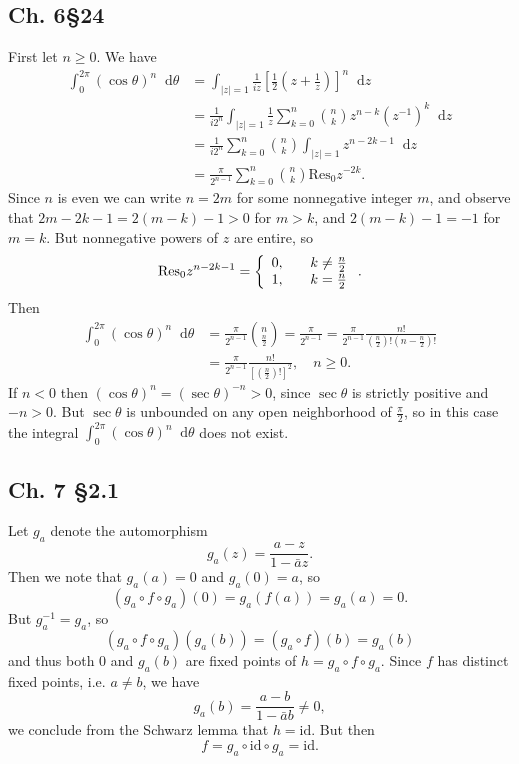 \documentclass{article}
\newcommand\id{\mathrm{id}}
\newcommand\Res{\mathrm{Res}}
\newcommand\dif{\mathop{}\!\mathrm{d}}
\begin{document}
\subsection{Ch. 6\S 24}
First let $n \geq 0$. We have
\begin{align*}
   \int_0^{2\pi}
     (\cos \theta)^n
     \dif \theta
&= \int_{|z| = 1}
     \frac{1}{iz}
     \left[
       \frac{1}{2}
       \left(
         z + \frac{1}{z}
       \right)
     \right]^n
     \dif z \\
&= \frac{1}{i 2^n}
   \int_{|z| = 1}
     \frac{1}{z}
     \sum_{k = 0}^{n}
       {n \choose k}
       z^{n - k}
       (z^{-1})^k
     \dif z \\
&= \frac{1}{i 2^n}
   \sum_{k = 0}^n
     {n \choose k}
     \int_{|z| = 1}
       z^{n - 2k - 1}
       \dif z \\
&= \frac{\pi}{2^{n-1}}
   \sum_{k = 0}^n
     {n \choose k}
     \Res_0 z^{-2k}.
\end{align*}
Since $n$ is even we can write $n = 2m$ for some nonnegative
integer $m$, and observe that
$2m - 2k - 1 = 2(m - k) - 1 > 0$ for $m > k$, and
$2(m - k) - 1 = -1$ for $m = k$. But nonnegative powers of
$z$ are entire, so
$$
  \Res_0 z^{n - 2k - 1}
= \left\{
    \begin{array}{c c}
      0, & \quad k \neq \frac{n}{2} \\
      1, & \quad k = \frac{n}{2}
    \end{array}
  \right..
$$
Then
\begin{align*}
   \int_0^{2\pi}
     (\cos \theta)^n
     \dif \theta
&= \frac{\pi}{2^{n-1}}
     {n \choose \frac{n}{2}}
 = \frac{\pi}{2^{n-1}}
 = \frac{\pi}{2^{n-1}}
     \frac{n!}
          {\left(\frac{n}{2}\right)!
           \left(n - \frac{n}{2}\right)!} \\
&= \frac{\pi}{2^{n-1}}
     \frac{n!}
          {\left[
             \left(\frac{n}{2}\right)!
           \right]^2}
, \quad n \geq 0.
\end{align*}
If $n < 0$ then $(\cos \theta)^n = (\sec \theta)^{-n} > 0$, since
$\sec \theta$ is strictly positive and $-n > 0$. But $\sec \theta$
is unbounded on any open neighborhood of $\frac{\pi}{2}$, so in this
case the integral $\int_0^{2\pi} (\cos \theta)^n \dif \theta$ does not
exist.

\subsection{Ch. 7 \S 2.1}
Let $g_a$ denote the automorphism
$$
g_a(z) = \frac{a - z}{1 - \bar{a} z}.
$$
Then we note that $g_a(a) = 0$ and $g_a(0) = a$, so
$$
  (g_a \circ f \circ g_a)(0)
= g_a(f(a))
= g_a(a)
= 0.
$$
But $g_a^{-1} = g_a$, so
$$
  (g_a \circ f \circ g_a)(g_a(b))
= (g_a \circ f)(b)
= g_a(b)
$$
and thus both 0 and $g_a(b)$ are fixed points of
$h = g_a \circ f \circ g_a$. Since $f$ has distinct
fixed points, i.e. $a \neq b$, we
have
$$
g_a(b) = \frac{a - b}{1 - \bar{a} b} \neq 0,
$$
we conclude from the Schwarz lemma that
$h = \id$. But then
$$
f = g_a \circ \id \circ g_a = \id.
$$
\end{document}
